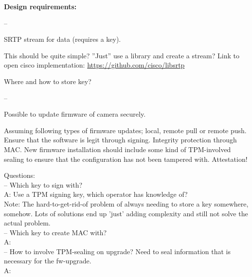 \documentclass[10pt]{article}
\newenvironment{checklist}{%
  \begin{list}{}{}%
  \let\olditem\item
  \renewcommand\item{\olditem -- \marginpar{$\Box$} }
  \newcommand\checkeditem{\olditem -- \marginpar{$\CheckedBox$} }
}{%
  \end{list}
}
\begin{document}
    \textbf{Design requirements:}
    \begin{checklist}
      \item{
        SRTP stream for data (requires a key).

        This should be quite simple? ''Just'' use a library and create a
        stream? Link to open cisco implementation:
        \url{https://github.com/cisco/libsrtp}

	Where and how to store key?
      }
      \item{
        Possible to update firmware of camera securely.

        Assuming following types of firmware updates; local, remote pull or
        remote push. Ensure that the software is legit through signing.
        Integrity protection through MAC. New firmware installation should
        include some kind of TPM-involved sealing to ensure that the configuration
        has not been tampered with. Attestation!

        Questions: \\
        -- Which key to sign with? \\
        A: Use a TPM signing key, which operator has knowledge of? \\
	Note: The hard-to-get-rid-of problem of always needing to store a key somewhere, somehow. Lots of solutions end up 'just' adding complexity
	and still not solve the actual problem. \\
        -- Which key to create MAC with? \\
        A: \\
        -- How to involve TPM-sealing on upgrade? Need to seal information that
        is necessary for the fw-upgrade.\\
        A: \\

}
\end{checklist}
\end{document}
